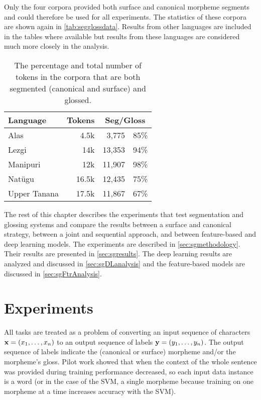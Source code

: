 Only the four corpora provided both surface and canonical morpheme segments and could therefore be used for all experiments. The statistics of these corpora are shown again in \autoref{tab:segglossdata}. Results from other languages are included in the tables where available but results from these languages are considered much more closely in the analysis. 

\begin{table}[!tb]
    \centering
    \begin{tabular}{l|r|rc}
         \textbf{Language} & \textbf{Tokens} & \multicolumn{2}{c}{\textbf{Seg/Gloss}} \\
         \hline
         Alas & 4.5k & 3,775 & 85\%  \\
         \hline
         Lezgi & 14k & 13,353  & 94\% \\
         \hline
         Manipuri & 12k & 11,907 & 98\% \\
         \hline
         Natügu & 16.5k & 12,435 & 75\%  \\
         \hline
         Upper Tanana & 17.5k & 11,867 & 67\% 
    \end{tabular}
    \caption[Data for Segmentation and Glossing Experimentation]{The percentage and total number of tokens in the corpora that are both segmented (canonical and surface) and glossed.}
    \label{tab:segglossdata}
\end{table}

The rest of this chapter describes the experiments that test segmentation and glossing systems and compare the results between a surface and canonical strategy, between a joint and sequential approach, and between feature-based and deep learning models. The experiments are described in \autoref{sec:sgmethodology}. Their results are presented in \autoref{sec:sgresults}. The deep learning results are analyzed and discussed in \autoref{sec:sgDLanalysis} and the feature-based models are discussed in \autoref{sec:sgFtrAnalysis}. 


\section{Experiments}
\label{sec:sgmethodology}

All tasks are treated as a problem of converting an input sequence of characters $\mathbf{x} = (x_1, \ldots, x_n)$ to an output sequence of labels $\mathbf{y} = (y_1, \ldots, y_n)$. The output sequence of labels indicate the (canonical or surface) morpheme and/or the morpheme's gloss. Pilot work showed that when the context of the whole sentence was provided during training performance decreased, so each input data instance is a word (or in the case of the SVM, a single morpheme because training on one morpheme at a time increases accuracy with the SVM). 

